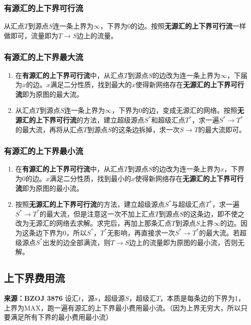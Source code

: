\documentclass[landscape,twocolumn,a4paper]{article}
\begin{document}
	\subsubsection*{有源汇的上下界可行流}
	从汇点$T$到源点$S$连一条上界为$\infty$，下界为$0$的边。按照\textbf{无源汇的上下界可行流}一样做即可，流量即为$T \rightarrow S$边上的流量。
	
	\subsubsection*{有源汇的上下界最大流}
	\begin{enumerate}
		\item 在\textbf{有源汇的上下界可行流}中，从汇点$T$到源点$S$的边改为连一条上界为$\infty$，下届为$x$的边。$x$满足二分性质，找到最大的$x$使得新网络存在\textbf{无源汇的上下界可行流}即为原图的最大流。
		\item 从汇点$T$到源点$S$连一条上界为$\infty$，下界为$0$的边，变成无源汇的网络。按照\textbf{无源汇的上下界可行流}的方法，建立超级源点$S^*$和超级汇点$T^*$，求一遍$S^* \rightarrow T^*$的最大流，再将从汇点$T$到源点$S$的这条边拆掉，求一次$S \rightarrow T$的最大流即可。
	\end{enumerate}
	
	\subsubsection*{有源汇的上下界最小流}
	\begin{enumerate}
		\item 在\textbf{有源汇的上下界可行流}中，从汇点$T$到源点$S$的边改为连一条上界为$x$，下界为$0$的边。$x$满足二分性质，找到最小的$x$使得新网络存在\textbf{无源汇的上下界可行流}即为原图的最小流。
		\item 按照\textbf{无源汇的上下界可行流}的方法，建立超级源点$S^*$与超级汇点$T^*$，求一遍$S^* \rightarrow T^*$的最大流，但是注意这一次不加上汇点$T$到源点$S$的这条边，即不使之改为无源汇的网络去求解。求完后，再加上那条汇点$T$到源点$S$上界$\infty$的边。因为这条边下界为$0$，所以$S^*$，$T^*$无影响，再直接求一次$S^* \rightarrow T^*$的最大流。若超级源点$S^*$出发的边全部满流，则$T \rightarrow S$边上的流量即为原图的最小流，否则无解。
	\end{enumerate}
	
	\subsection{上下界费用流}
	\noindent \textbf{来源：BZOJ 3876}
	\noindent 设汇$t$，源$s$，超级源$S$，超级汇$T$，本质是每条边的下界为1，上界为MAX，跑一遍有源汇的上下界最小费用最小流。（因为上界无穷大，所以只要满足所有下界的最小费用最小流）
	
\end{document}
